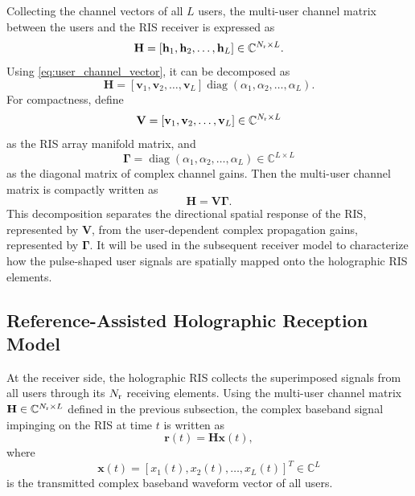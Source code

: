 \documentclass[journal]{IEEEtran}
\begin{document}
Collecting the channel vectors of all $L$ users, the multi-user channel matrix between the users and the RIS receiver is expressed as
\begin{equation}
\mathbf{H}
=
[\mathbf{h}_1,\mathbf{h}_2,\ldots,\mathbf{h}_L]
\in\mathbb{C}^{N_{\rm r}\times L}.
\label{eq:multiuser_channel_matrix}
\end{equation}
Using \eqref{eq:user_channel_vector}, it can be decomposed as
\begin{equation}
\mathbf{H}
=
[\mathbf{v}_1,\mathbf{v}_2,\ldots,\mathbf{v}_L]
\operatorname{diag}(\alpha_1,\alpha_2,\ldots,\alpha_L).
\end{equation}
For compactness, define
\begin{equation}
\mathbf{V}
=
[\mathbf{v}_1,\mathbf{v}_2,\ldots,\mathbf{v}_L]
\in\mathbb{C}^{N_{\rm r}\times L}
\end{equation}
as the RIS array manifold matrix, and
\begin{equation}
\boldsymbol{\Gamma}
=
\operatorname{diag}(\alpha_1,\alpha_2,\ldots,\alpha_L)
\in\mathbb{C}^{L\times L}
\end{equation}
as the diagonal matrix of complex channel gains. 
Then the multi-user channel matrix is compactly written as
\begin{equation}
\mathbf{H}
=
\mathbf{V}\boldsymbol{\Gamma}.
\label{eq:H_V_Gamma}
\end{equation}
This decomposition separates the directional spatial response of the RIS, represented by $\mathbf{V}$, from the user-dependent complex propagation gains, represented by $\boldsymbol{\Gamma}$. 
It will be used in the subsequent receiver model to characterize how the pulse-shaped user signals are spatially mapped onto the holographic RIS elements.


\subsection{Reference-Assisted Holographic Reception Model}

At the receiver side, the holographic RIS collects the superimposed signals from all users through its $N_{\rm r}$ receiving elements. 
Using the multi-user channel matrix $\mathbf{H}\in\mathbb{C}^{N_{\rm r}\times L}$ defined in the previous subsection, the complex baseband signal impinging on the RIS at time $t$ is written as
\begin{equation}
\mathbf{r}(t)
=
\mathbf{H}\mathbf{x}(t),
\label{eq:received_baseband_field}
\end{equation}
where 
\begin{equation}
\mathbf{x}(t)
=
[x_1(t),x_2(t),\ldots,x_L(t)]^T
\in\mathbb{C}^{L}
\end{equation}
is the transmitted complex baseband waveform vector of all users.
\end{document}
